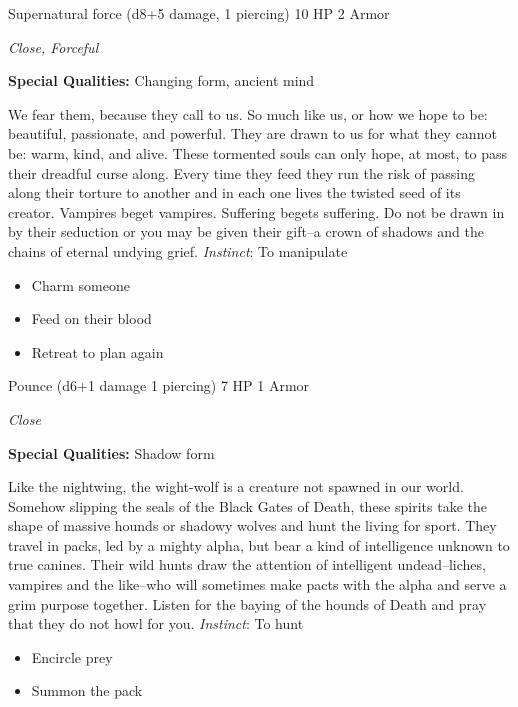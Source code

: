 \HRule
{}

Supernatural force (d8+5 damage, 1 piercing)\hspace*{\fill} 10 HP 2 Armor

\emph{Close, Forceful}

\textbf{Special Qualities:}
Changing form, ancient mind

\HRule
We fear them, because they call to us. So much like us, or how we hope to be: beautiful, passionate, and powerful. They are drawn to us for what they cannot be: warm, kind, and alive. These tormented souls can only hope, at most, to pass their dreadful curse along. Every time they feed they run the risk of passing along their torture to another and in each one lives the twisted seed of its creator. Vampires beget vampires. Suffering begets suffering. Do not be drawn in by their seduction or you may be given their gift--a crown of shadows and the chains of eternal undying grief. \emph{Instinct}: To manipulate
\begin{itemize}
\item Charm someone
\item Feed on their blood
\item Retreat to plan again
\end{itemize}

\HRule
{}

Pounce (d6+1 damage 1 piercing)\hspace*{\fill} 7 HP 1 Armor

\emph{Close}

\textbf{Special Qualities:}
Shadow form

\HRule
Like the nightwing, the wight-wolf is a creature not spawned in our world. Somehow slipping the seals of the Black Gates of Death, these spirits take the shape of massive hounds or shadowy wolves and hunt the living for sport. They travel in packs, led by a mighty alpha, but bear a kind of intelligence unknown to true canines. Their wild hunts draw the attention of intelligent undead--liches, vampires and the like--who will sometimes make pacts with the alpha and serve a grim purpose together. Listen for the baying of the hounds of Death and pray that they do not howl for you. \emph{Instinct}: To hunt
\begin{itemize}
\item Encircle prey
\item Summon the pack
\end{itemize}

